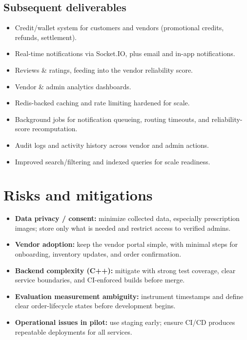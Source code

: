 \documentclass{article}
\begin{document}
\subsection{Subsequent deliverables}
\begin{itemize}
    \item Credit/wallet system for customers and vendors (promotional credits, refunds,
    settlement).
    \item Real-time notifications via Socket.IO, plus email and in-app notifications.
    \item Reviews \& ratings, feeding into the vendor reliability score.
    \item Vendor \& admin analytics dashboards.
    \item Redis-backed caching and rate limiting hardened for scale.
    \item Background jobs for notification queueing, routing timeouts, and reliability-score
    recomputation.
    \item Audit logs and activity history across vendor and admin actions.
    \item Improved search/filtering and indexed queries for scale readiness.
\end{itemize}

\section{Risks and mitigations}
\begin{itemize}
    \item \textbf{Data privacy / consent:} minimize collected data, especially prescription
    images; store only what is needed and restrict access to verified admins.
    \item \textbf{Vendor adoption:} keep the vendor portal simple, with minimal steps for
    onboarding, inventory updates, and order confirmation.
    \item \textbf{Backend complexity (C++):} mitigate with strong test coverage, clear service
    boundaries, and CI-enforced builds before merge.
    \item \textbf{Evaluation measurement ambiguity:} instrument timestamps and define clear
    order-lifecycle states before development begins.
    \item \textbf{Operational issues in pilot:} use staging early; ensure CI/CD produces
    repeatable deployments for all services.
\end{itemize}
\end{document}
